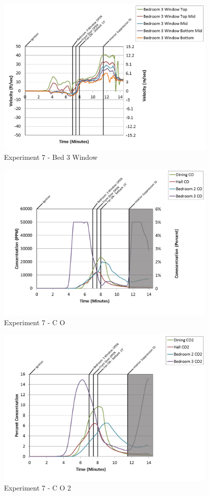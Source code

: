 \documentclass{article}
\begin{document}
\begin{appendices}
\begin{figure}[h!]
	\centering
	\includegraphics[height=3.05in]{0_Images/Results_Charts/Exp_7_Charts/Bed3Window.png}
	\caption{Experiment 7 - Bed 3 Window}
\end{figure}

\clearpage

\begin{figure}[h!]
	\centering
	\includegraphics[height=3.05in]{0_Images/Results_Charts/Exp_7_Charts/CO.png}
	\caption{Experiment 7 - C O}
\end{figure}


\begin{figure}[h!]
	\centering
	\includegraphics[height=3.05in]{0_Images/Results_Charts/Exp_7_Charts/CO2.png}
	\caption{Experiment 7 - C O 2}
\end{figure}


\end{appendices}
\end{document}
